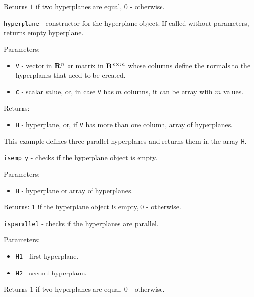 \documentclass{report}
\begin{document}
Returns $1$ if two hyperplanes are equal, $0$ - otherwise.



\newpage

{\Large {\tt hyperplane}} - constructor for the hyperplane object.
If called without parameters, returns empty hyperplane.

Parameters:
\begin{itemize}
\item {\tt V} - vector in ${\bf R}^n$ or matrix in ${\bf R}^{n\times m}$ whose
columns define the normals to the hyperplanes that need to be created.
\item {\tt C} - scalar value, or, in case {\tt V} has $m$ columns, it can be
array with $m$ values.
\end{itemize}

Returns:
\begin{itemize}
\item {\tt H} - hyperplane, or, if {\tt V} has more than one column,
array of hyperplanes.
\end{itemize}


This example defines three parallel hyperplanes and returns them in the array {\tt H}.

\newpage

{\Large {\tt isempty}} - checks if the hyperplane object is empty.

Parameters:
\begin{itemize}
\item {\tt H} - hyperplane or array of hyperplanes.
\end{itemize}

Returns: $1$ if the hyperplane object is empty, $0$ - otherwise.

\newpage

{\Large {\tt isparallel}} - checks if the hyperplanes are parallel.

Parameters:
\begin{itemize}
\item {\tt H1} - first hyperplane.
\item {\tt H2} - second hyperplane.
\end{itemize}

Returns $1$ if two hyperplanes are equal, $0$ - otherwise.

\end{document}

